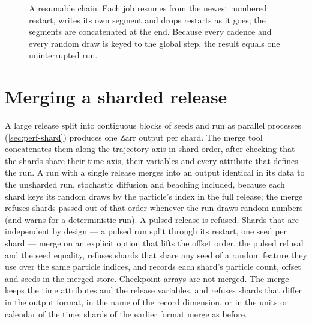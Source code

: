 \begin{figure}[t]
\centering
{}
\caption{A resumable chain. Each job resumes from the newest numbered restart, writes its own segment and
drops restarts as it goes; the segments are concatenated at the end. Because every cadence and every random
draw is keyed to the global step, the result equals one uninterrupted run.}
\label{fig:out-chain}
\end{figure}

\section{Merging a sharded release}\label{sec:out-merge}

A large release split into contiguous blocks of seeds and run as parallel processes (\cref{sec:perf-shard})
produces one Zarr output per shard. The merge tool concatenates them along the trajectory axis in shard
order, after checking that the shards share their time axis, their variables and every attribute that
defines the run. A run with a single release merges into an output identical in its data to the unsharded run, stochastic
diffusion and beaching included, because each shard keys its random draws by the particle's index in the
full release; the merge refuses shards passed out of that order whenever the run draws random numbers (and
warns for a deterministic run). A pulsed release is refused. Shards that are independent by design --- a
pulsed run split through its restart, one seed per shard --- merge on an explicit option that lifts the offset
order, the pulsed refusal and the seed equality, refuses shards that share any seed of a random feature they
use over the same particle indices, and records each shard's particle count, offset and seeds in the merged store. Checkpoint
arrays are not merged. The merge keeps the time attributes and the release variables, and refuses shards that
differ in the output format, in the name of the record dimension, or in the units or calendar of the time;
shards of the earlier format merge as before.

